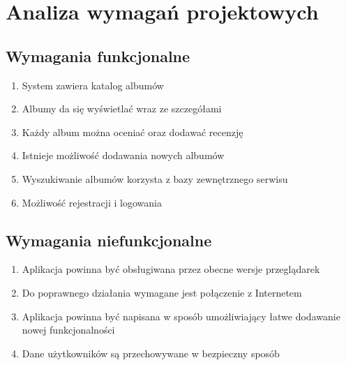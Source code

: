 
\chapter{Analiza wymagań projektowych}

\section{Wymagania funkcjonalne}
	\begin{enumerate}
		\item System zawiera katalog albumów
		\item Albumy da się wyświetlać wraz ze szczegółami
		\item Każdy album można oceniać oraz dodawać recenzję
		\item Istnieje możliwość dodawania nowych albumów
		\item Wyszukiwanie albumów korzysta z bazy zewnętrznego serwisu
		\item Możliwość rejestracji i logowania
	\end{enumerate}

\section{Wymagania niefunkcjonalne}
	\begin{enumerate}
		\item Aplikacja powinna być obsługiwana przez obecne wersje przeglądarek
		\item Do poprawnego działania wymagane jest połączenie z Internetem
		\item Aplikacja powinna być napisana w sposób umożliwiający łatwe dodawanie nowej funkcjonalności
		\item Dane użytkowników są przechowywane w bezpieczny sposób
	\end{enumerate}

